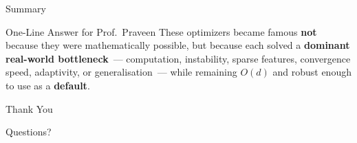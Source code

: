 \documentclass{beamer}
\begin{document}
\begin{frame}[shrink=10]{Summary}
  \medskip

  \begin{exampleblock}{One-Line Answer for Prof.\ Praveen}
    These optimizers became famous \textbf{not} because they were
    mathematically possible, but because each solved a
    \textbf{dominant real-world bottleneck}~--- computation,
    instability, sparse features, convergence speed, adaptivity,
    or generalisation~--- while remaining $O(d)$ and robust enough
    to use as a \textbf{default}.
  \end{exampleblock}
\end{frame}

\begin{frame}
  \Huge{\centerline{Thank You}}
  \vspace{0.6cm}
  \large{\centerline{Questions?}}
\end{frame}

\end{document}
